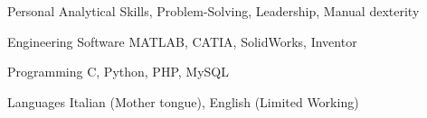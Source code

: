 

\begin{cvskills}

  \cvskill
  {Personal} %
  {Analytical Skills, Problem-Solving, Leadership, Manual dexterity} %

  \cvskill
  {Engineering Software} %
  {MATLAB, CATIA, SolidWorks, Inventor} %

  \cvskill
  {Programming} %
  {C, Python, PHP, MySQL} %

  \cvskill
  {Languages} %
  {Italian (Mother tongue), English (Limited Working)} %

\end{cvskills}
